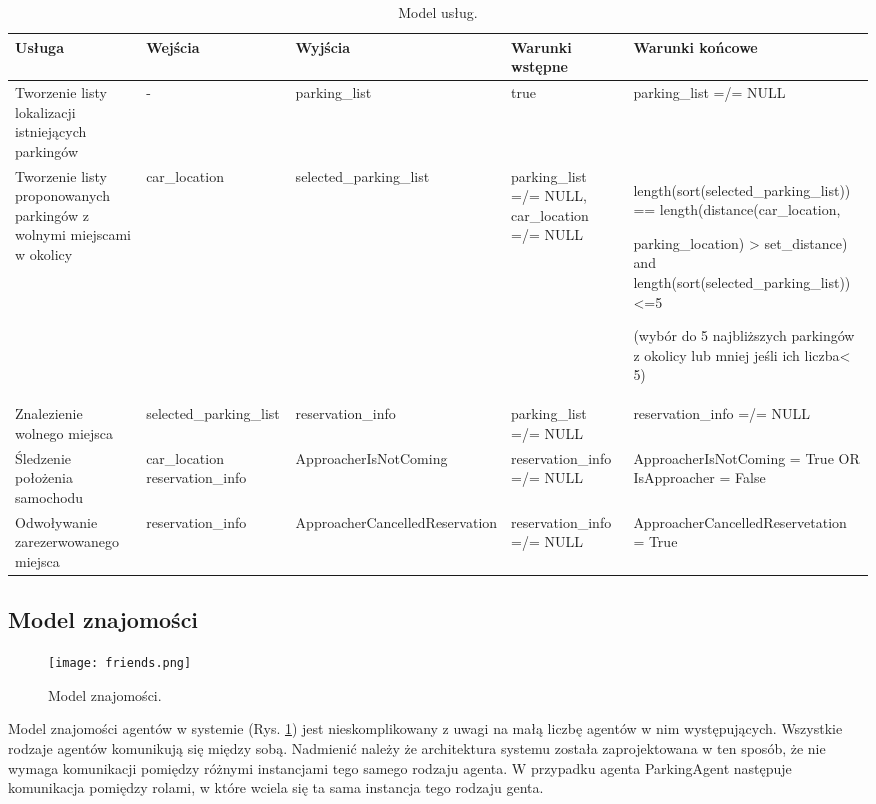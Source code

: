 \begin{table}[!h] \label{tab:modeluslug} \centering
    \caption{Model usług.}
    \begin{tabular} {| m{2cm} | m{2cm} | m{3cm} | m{3cm} | m{4cm} |} \hline
        Usługa   & Wejścia & Wyjścia & Warunki wstępne & Warunki końcowe \\ \hline
        Tworzenie listy lokalizacji istniejących parkingów & - & parking\_list & true & parking\_list =/= NULL \\ \hline
        Tworzenie listy proponowanych parkingów z wolnymi miejscami w okolicy & car\_location & selected\_\-parking\_list & parking\_list =/= NULL, car\_location =/= NULL & length(sort(selected\_\-parking\_list)) == length(distance(car\_\-location, 
        
        parking\_location) > set\_distance) and length(sort(selected\_\-parking\_list)) <=5

        (wybór  do 5 najbliższych parkingów  z okolicy lub mniej  jeśli ich liczba< 5)
         \\ \hline
        Znalezienie wolnego miejsca & selected\_\-parking\_list & reservation\_info & parking\_list =/= NULL & reservation\_info =/= NULL \\ \hline
        Śledzenie położenia samochodu & car\_location reservation\_info & ApproacherIsNot\-Coming & reservation\_info =/= NULL & ApproacherIsNot\-Coming = True OR IsApproacher = False \\ \hline
        Odwoływanie zarezerwowanego miejsca & reserva\-tion\_info & Approacher\-Cancelled\-Reservation & reservation\_info =/= NULL & ApproacherCancelled\-Reservetation = True \\ \hline
    \end{tabular}
\end{table}



\newpage
\subsection{Model znajomości}

\begin{figure}[h!]
    \centering \texttt{[image: friends.png]}
    \caption{Model znajomości.}
    \label{fig:friends}
\end{figure}

Model znajomości agentów w systemie (Rys. \ref{fig:friends}) jest nieskomplikowany z uwagi na małą liczbę agentów w nim występujących. Wszystkie rodzaje agentów komunikują się między sobą. Nadmienić należy że architektura systemu została zaprojektowana w ten sposób, że nie wymaga komunikacji pomiędzy różnymi instancjami tego samego rodzaju agenta. W przypadku agenta ParkingAgent następuje komunikacja pomiędzy rolami, w które wciela się ta sama instancja tego rodzaju genta.